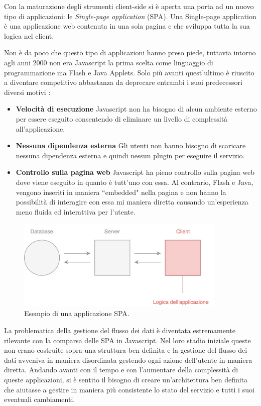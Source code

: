 Con la maturazione degli strumenti client-side si è aperta una porta ad un nuovo tipo di applicazioni: le \textit{Single-page application} (SPA). Una Single-page application è una applicazione web contenuta in una sola pagina e che sviluppa tutta la sua logica nel client.

Non è da poco che questo tipo di applicazioni hanno preso piede, tuttavia intorno agli anni 2000 non era Javascript la prima scelta come linguaggio di programmazione ma Flash e Java Applets. Solo più avanti quest'ultimo è riuscito a diventare competitivo abbastanza da deprecare entrambi i suoi predecessori diversi motivi \cite{mikowski2013single}:

\begin{itemize}
    \item \textbf{Velocità di esecuzione} Javascript non ha bisogno di alcun ambiente esterno per essere eseguito consentendo di eliminare un livello di complessità all'applicazione.
    \item \textbf{Nessuna dipendenza esterna} Gli utenti non hanno bisogno di scaricare nessuna dipendenza esterna e quindi nessun plugin per eseguire il servizio.
    \item \textbf{Controllo sulla pagina web} Javascript ha pieno controllo sulla pagina web dove viene eseguito in quanto è tutt'uno con essa. Al contrario, Flash e Java, vengono inseriti in maniera “embedded" nella pagina e non hanno la possibilità di interagire con essa mi maniera diretta causando un'esperienza meno fluida ed interattiva per l'utente.
\end{itemize}

\begin{figure}[h]
\centering
\includegraphics[width=10cm]{./images/yesSPA} 
\caption{Esempio di una applicazione SPA.}
\end{figure}

La problematica della gestione del flusso dei dati è diventata estremamente rilevante con la comparsa delle SPA in Javascript. Nel loro stadio iniziale queste non erano costruite sopra una struttura ben definita e la gestione del flusso dei dati avveniva in maniera disordinata gestendo ogni azione dell'utente in maniera diretta.
Andando avanti con il tempo e con l'aumentare della complessità di queste applicazioni, si è sentito il bisogno di creare un'architettura ben definita che aiutasse a gestire in maniera più consistente lo stato del servizio e tutti i suoi eventuali cambiamenti.

